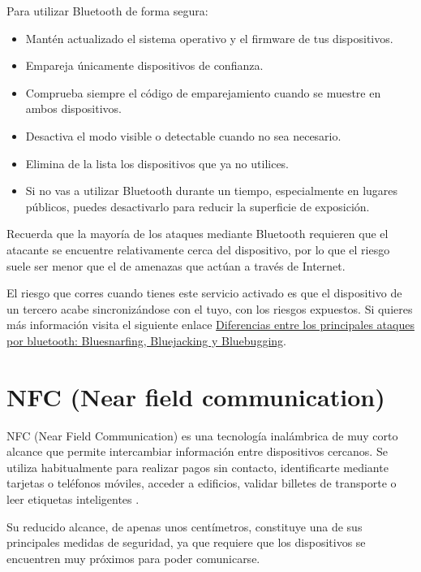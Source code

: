 \documentclass[
  spanish,
  a4paper,
  openany]{book}
\begin{document}
Para utilizar Bluetooth de forma segura:

\begin{itemize}
\item
  Mantén actualizado el sistema operativo y el firmware de tus dispositivos.
\item
  Empareja únicamente dispositivos de confianza.
\item
  Comprueba siempre el código de emparejamiento cuando se muestre en ambos dispositivos.
\item
  Desactiva el modo visible o detectable cuando no sea necesario.
\item
  Elimina de la lista los dispositivos que ya no utilices.
\item
  Si no vas a utilizar Bluetooth durante un tiempo, especialmente en lugares públicos, puedes desactivarlo para reducir la superficie de exposición.
\end{itemize}

Recuerda que la mayoría de los ataques mediante Bluetooth requieren que el atacante se encuentre relativamente cerca del dispositivo, por lo que el riesgo suele ser menor que el de amenazas que actúan a través de Internet.

El riesgo que corres cuando tienes este servicio activado es que el dispositivo de un tercero acabe sincronizándose con el tuyo, con los riesgos expuestos.
Si quieres más información visita el siguiente enlace \href{https://computerhoy.com/noticias/tecnologia/diferencias-principales-ataques-bluetooth-bluesnarfing-bluejacking-bluebugging-1087867}{Diferencias entre los principales ataques por bluetooth: Bluesnarfing, Bluejacking y Bluebugging}.

\section{NFC (Near field communication)}\label{nfc-near-field-communication}

NFC (Near Field Communication) es una tecnología inalámbrica de muy corto alcance que permite intercambiar información entre dispositivos cercanos. Se utiliza habitualmente para realizar pagos sin contacto, identificarte mediante tarjetas o teléfonos móviles, acceder a edificios, validar billetes de transporte o leer etiquetas inteligentes \citep{IONOS-nfc}.

Su reducido alcance, de apenas unos centímetros, constituye una de sus principales medidas de seguridad, ya que requiere que los dispositivos se encuentren muy próximos para poder comunicarse.
\end{document}
